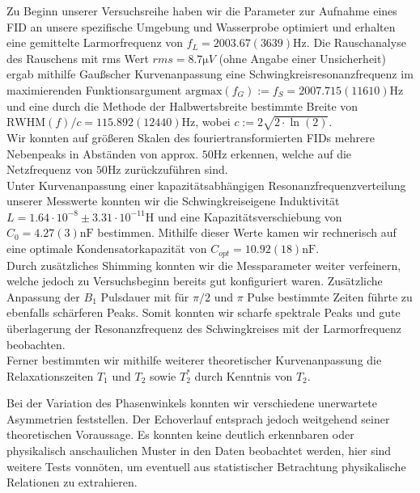 \documentclass[../main.tex]{subfiles}
\begin{document}
    Zu Beginn unserer Versuchsreihe haben wir die Parameter zur Aufnahme eines FID an unsere spezifische Umgebung und Wasserprobe optimiert und erhalten eine gemittelte Larmorfrequenz von $f_L = 2003.67(3639)\si{\hertz}$. Die Rauschanalyse des Rauschens mit rms Wert $\textit{rms}=8.7\si{\micro V}$ (ohne Angabe einer Unsicherheit) ergab mithilfe Gaußscher Kurvenanpassung eine Schwingkreisresonanzfrequenz im maximierenden Funktionsargument $\text{argmax}(f_G):=f_S = 2007.715(11610)\si{\hertz}$ und eine durch die Methode der Halbwertsbreite bestimmte Breite von $\text{RWHM}(f)/c = 115.892(12440)\si{\hertz}$, wobei $c:=2\sqrt{2\cdot\ln(2)}$. \\
    Wir konnten auf größeren Skalen des fouriertransformierten FIDs mehrere Nebenpeaks in Abständen von approx. $50\si{\hertz}$ erkennen, welche auf die Netzfrequenz von $50\si{\hertz}$ zurückzuführen sind. \\

    Unter Kurvenanpassung einer kapazitätsabhängigen Resonanzfrequenzverteilung unserer Messwerte konnten wir die Schwingkreiseigene Induktivität $L = 1.64\cdot 10^{-8}\pm3.31\cdot 10^{-11}\si{\henry}$ und eine Kapazitätsverschiebung von $C_0 = 4.27(3)\si{\nano\farad}$ bestimmen. Mithilfe dieser Werte kamen wir rechnerisch auf eine optimale Kondensatorkapazität von $C_{opt} = 10.92(18)\si{\nano\farad}$. \\
    Durch zusätzliches Shimming konnten wir die Messparameter weiter verfeinern, welche jedoch zu Versuchsbeginn bereits gut konfiguriert waren. Zusätzliche Anpassung der $B_1$ Pulsdauer mit für $\pi/2$ und $\pi$ Pulse bestimmte Zeiten führte zu ebenfalls schärferen Peaks. Somit konnten wir scharfe spektrale Peaks und gute überlagerung der Resonanzfrequenz des Schwingkreises mit der Larmorfrequenz beobachten. \\
        
    Ferner bestimmten wir mithilfe weiterer theoretischer Kurvenanpassung die Relaxationszeiten $T_1$ und $T_2$ sowie $T_2^*$ durch Kenntnis von $T_2$.

    Bei der Variation des Phasenwinkels konnten wir verschiedene unerwartete Asymmetrien feststellen. Der Echoverlauf entsprach jedoch weitgehend seiner theoretischen Voraussage. Es konnten keine deutlich erkennbaren oder physikalisch anschaulichen Muster in den Daten beobachtet werden, hier sind weitere Tests vonnöten, um eventuell aus statistischer Betrachtung physikalische Relationen zu extrahieren.\\
\end{document}
